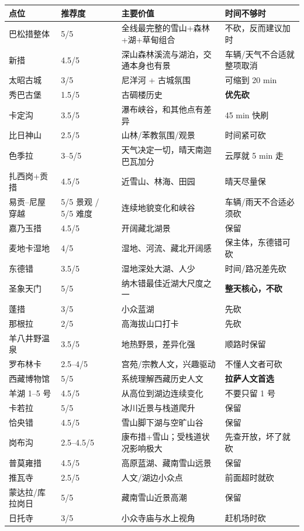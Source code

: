 \documentclass[10.5pt,a4paper]{ctexart}
\begin{document}
\begin{longtable}{p{3.3cm}p{2.0cm}p{7.3cm}p{3.0cm}}
\toprule
点位 & 推荐度 & 主要价值 & 时间不够时 \\
\midrule
巴松措整体 & 5/5 & 全线最完整的雪山+森林+湖+草甸组合 & 不砍，反而建议加时 \\
新措 & 4.5/5 & 深山森林溪流与湖泊，交通本身也有景 & 车辆/天气不合适就整项取消 \\
太昭古城 & 3/5 & 尼洋河 + 古城氛围 & 可缩到 20 min \\
秀巴古堡 & 1.5/5 & 古碉楼历史 & \textbf{优先砍} \\
卡定沟 & 3.5/5 & 瀑布峡谷，和其他点有差异 & 45 min 快刷 \\
比日神山 & 2.5/5 & 山林/苯教氛围/观景 & 时间紧可砍 \\
色季拉 & 3--5/5 & 天气决定一切，晴天南迦巴瓦加分 & 云厚就 5 min 走 \\
扎西岗+贡措 & 4.5/5 & 近雪山、林海、田园 & 晴天尽量保 \\
易贡--尼屋穿越 & 5/5 景观 / 5/5 难度 & 连续地貌变化和峡谷 & 车辆/雨天不合适必须砍 \\
嘉乃玉措 & 4.5/5 & 开阔藏北湖景 & 保留 \\
麦地卡湿地 & 4/5 & 湿地、河流、藏北开阔感 & 保主体，东德错可砍 \\
东德错 & 3.5/5 & 湿地深处大湖、人少 & 时间/路况差先砍 \\
圣象天门 & 5/5 & 纳木错最佳近湖大尺度之一 & \textbf{整天核心，不砍} \\
蓬措 & 3/5 & 小众蓝湖 & 先砍 \\
那根拉 & 2/5 & 高海拔山口打卡 & 先砍 \\
羊八井野温泉 & 3.5/5 & 地热野景，差异化强 & 顺路时保留 \\
罗布林卡 & 2.5--4/5 & 宫苑/宗教人文，兴趣驱动 & 不懂人文者可砍 \\
西藏博物馆 & 5/5 & 系统理解西藏历史人文 & \textbf{拉萨人文首选} \\
羊湖 1--5 号 & 4.5/5 & 从高位到湖边连续变化 & 不要只留 1 号 \\
卡若拉 & 5/5 & 冰川近景与栈道爬升 & 保留 \\
恰央错 & 4.5/5 & 雪山脚下湖与空旷山谷 & 保留 \\
岗布沟 & 2.5--4.5/5 & 康布措+雪山；受栈道状况影响极大 & 先查开放，坏了就砍 \\
普莫雍措 & 4.5/5 & 高原蓝湖、藏南雪山远景 & 保留 \\
推瓦寺 & 2.5/5 & 人文/湖边小众点 & 前面超时就砍 \\
蒙达拉/库拉岗日 & 5/5 & 藏南雪山近景高潮 & 保留 \\
日托寺 & 3/5 & 小众寺庙与水上视角 & 赶机场时砍 \\
\bottomrule
\end{longtable}
\end{document}
